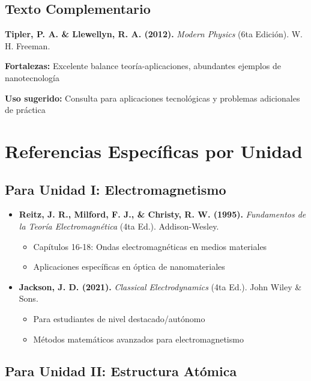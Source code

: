 \begin{tecnologiabox}
\begin{tecnologiabox}
\begin{tecnologiabox}
\subsection{Texto Complementario}

\begin{tcolorbox}[colback=green!5!white,colframe=green!50!black,title=Referencia Complementaria]
	\textbf{Tipler, P. A. \& Llewellyn, R. A. (2012).} \textit{Modern Physics} (6ta Edición). W. H. Freeman.
	
	\textbf{Fortalezas:} Excelente balance teoría-aplicaciones, abundantes ejemplos de nanotecnología
	
	\textbf{Uso sugerido:} Consulta para aplicaciones tecnológicas y problemas adicionales de práctica
\end{tcolorbox}

\section{Referencias Específicas por Unidad}

\subsection{Para Unidad I: Electromagnetismo}

\begin{itemize}
	\item \textbf{Reitz, J. R., Milford, F. J., \& Christy, R. W. (1995).} \textit{Fundamentos de la Teoría Electromagnética} (4ta Ed.). Addison-Wesley.
	\begin{itemize}
		\item Capítulos 16-18: Ondas electromagnéticas en medios materiales
		\item Aplicaciones específicas en óptica de nanomateriales
	\end{itemize}
	
	\item \textbf{Jackson, J. D. (2021).} \textit{Classical Electrodynamics} (4ta Ed.). John Wiley \& Sons.
	\begin{itemize}
		\item Para estudiantes de nivel destacado/autónomo
		\item Métodos matemáticos avanzados para electromagnetismo
	\end{itemize}
\end{itemize}

\subsection{Para Unidad II: Estructura Atómica}


\end{tecnologiabox}
\end{tecnologiabox}
\end{tecnologiabox}

